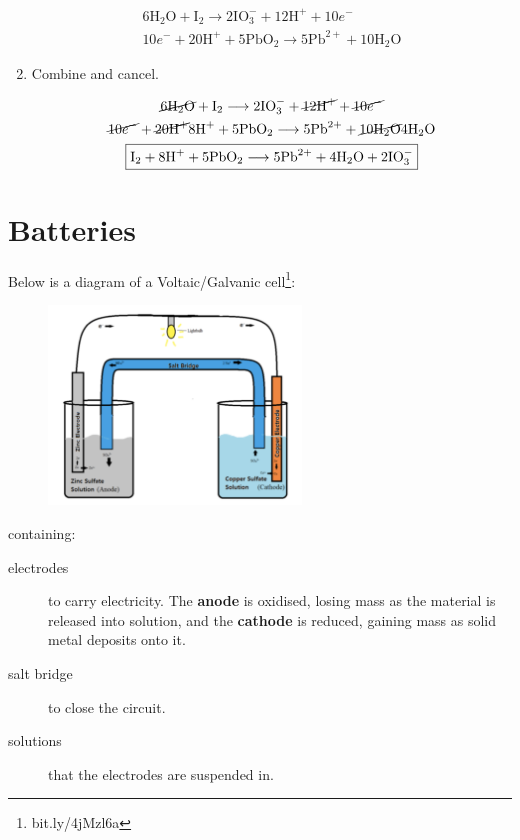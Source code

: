 \documentclass[a4paper, 12pt]{article}
\begin{document}
\begin{enumerate}[leftmargin=*]
\begin{gather*}
6\text{H$_2$O} + \text{I}_2 \longrightarrow 2\text{IO}_3^- + 12\text{H}^+ + 10e^-\\
10e^- + 20\text{H}^+ + 5\text{PbO}_2 \longrightarrow 5\text{Pb}^{2+} + 10\text{H$_2$O}
\end{gather*}

\item Combine and cancel.

\begin{gather*}
\cancel{6\text{H$_2$O}} + \text{I}_2 \longrightarrow 2\text{IO}_3^- + \cancel{12\text{H}^+} + \cancel{10e^-}\\
\cancel{10e^-} + \cancel{20\text{H}^+} 8\text{H}^+ + 5\text{PbO}_2 \longrightarrow 5\text{Pb}^{2+} + \cancel{10\text{H$_2$O}} 4\text{H$_2$O} \\
\boxed{\text{I}_2 + 8\text{H}^+ + 5\text{PbO}_2 \longrightarrow 5\text{Pb}^{2+} + 4\text{H$_2$O} + 2\text{IO}_3^-}
\end{gather*}

\end{enumerate}

\section{Batteries}
Below is a diagram of a Voltaic/Galvanic cell\footnote{bit.ly/4jMzl6a}:
\begin{figure}[H]
\centering
\includegraphics[width=0.6\textwidth]{voltaiccell}
\end{figure}

containing:

\begin{description}
\item[electrodes] to carry electricity. The \textbf{anode} is oxidised, losing mass as the material is released into solution, and the \textbf{cathode} is reduced, gaining mass as solid metal deposits onto it.
\item[salt bridge] to close the circuit. 
\item[solutions] that the electrodes are suspended in. 
\end{description}
\end{document}
